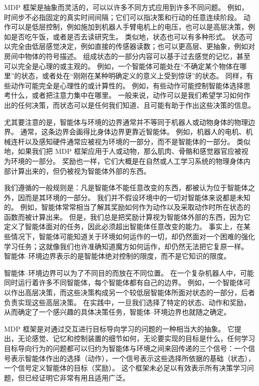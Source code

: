 \documentclass[UTF8,12pt,a4paper,fontset=fandol]{ctexart}
\begin{document}
MDP 框架是抽象而灵活的，可以以许多不同方式应用到许多不同问题。
例如，时间步不必指固定的真实时间间隔；它们可以指决策和行动的任意连续阶段。
动作可以是低层控制，例如施加到机器人手臂电机上的电压，也可以是高层决策，例如是否吃午饭，或者是否去读研究生。
类似地，状态也可以有多种形式。
状态可以完全由低层感觉决定，例如直接的传感器读数；也可以更高层、更抽象，例如对房间中物体的符号描述。
组成状态的一部分内容可以基于过去感觉的记忆，甚至可以完全是心理的或主观的。
例如，一个智能体可能处在“不确定某个物体在哪里”的状态，或者处在“刚刚在某种明确定义的意义上受到惊讶”的状态。
同样，有些动作可能完全是心理性的或计算性的。
例如，有些动作可能控制智能体选择思考什么，或者把注意力集中在哪里。
一般来说，动作可以是我们希望学习如何作出的任何决策，而状态可以是任何我们知道、且可能有助于作出这些决策的信息。

尤其要注意的是，智能体与环境的边界通常并不等同于机器人或动物身体的物理边界。
通常，这条边界会画得比身体边界更靠近智能体。
例如，机器人的电机、机械连杆以及感知硬件通常应被视为环境的一部分，而不是智能体的一部分。
类似地，如果我们把 MDP 框架应用于人或动物，那么肌肉、骨骼和感觉器官应被视为环境的一部分。
奖励也一样，它们大概是在自然或人工学习系统的物理身体内部计算出来的，但仍被视为智能体外部的东西。

我们遵循的一般规则是：凡是智能体不能任意改变的东西，都被认为位于智能体之外，因而是其环境的一部分。
我们并不假设环境中的一切对智能体来说都是未知的。
例如，智能体常常相当了解其奖励如何作为动作以及采取动作时所在状态的函数而被计算出来。
但是，我们总是把奖励计算视为智能体外部的东西，因为它定义了智能体面对的任务，因此必须超出智能体任意改变的能力。
事实上，在某些情况下，智能体可能知道关于环境如何运作的一切，却仍然面对一个困难的强化学习任务；这就像我们也许准确知道魔方如何运作，却仍然无法把它复原一样。
智能体--环境边界表示的是智能体绝对控制的限度，而不是它知识的限度。

智能体--环境边界可以为了不同目的而放在不同位置。
在一个复杂机器人中，可能同时运行着许多不同智能体，每个智能体都有自己的边界。
例如，一个智能体可以作出高层决策，而这些决策构成另一个较低层智能体所面对状态的一部分，后者负责实现这些高层决策。
在实践中，一旦我们选择了特定的状态、动作和奖励，从而确定了一个感兴趣的具体决策任务，智能体--环境边界也就随之确定。

MDP 框架是对通过交互进行目标导向学习的问题的一种相当大的抽象。
它提出，无论感觉、记忆和控制装置的细节如何，无论要实现的目标是什么，任何学习目标导向行为的问题都可以归约为智能体与环境之间来回传递的三个信号：一个信号表示智能体作出的选择（动作），一个信号表示这些选择所依据的基础（状态），一个信号定义智能体的目标（奖励）。
这个框架未必足以有效表示所有决策学习问题，但已经证明它非常有用且适用广泛。
\end{document}
